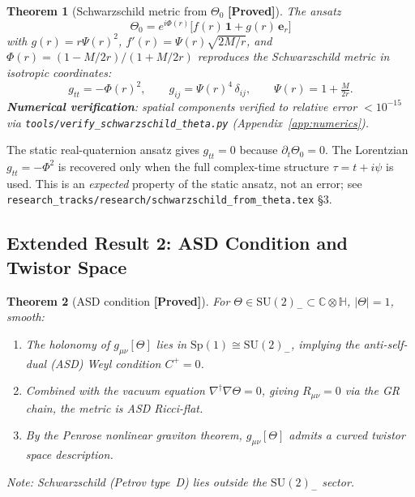 \documentclass[12pt,a4paper]{article}
\newtheorem{theorem}{Theorem}[section]
\theoremstyle{definition}
\theoremstyle{remark}
\newcommand{\PROVED}{\textbf{[Proved]}}
\begin{document}
\begin{theorem}[Schwarzschild metric from $\Theta_0$ \PROVED]
\label{thm:schwarzschild}
The ansatz
\[
  \Theta_0 = e^{i\Phi(r)}\bigl[f(r)\,\mathbf{1} + g(r)\,\boldsymbol{e}_r\bigr]
\]
with $g(r)=r\Psi(r)^2$, $f'(r)=\Psi(r)\sqrt{2M/r}$, and
$\Phi(r)=(1-M/2r)/(1+M/2r)$ reproduces the Schwarzschild metric in
isotropic coordinates:
\[
  g_{tt}=-\Phi(r)^2, \qquad
  g_{ij}=\Psi(r)^4\,\delta_{ij}, \qquad
  \Psi(r) = 1+\tfrac{M}{2r}.
\]
\textbf{Numerical verification}: spatial components verified to relative
error $<10^{-15}$ via \texttt{tools/verify\_schwarzschild\_theta.py}
(Appendix~\ref{app:numerics}).
\end{theorem}

\begin{tcolorbox}[colback=orange!5!white,colframe=orange!50!black,
  title=Limitation — temporal component,arc=3pt]
The static real-quaternion ansatz gives $g_{tt}=0$ because
$\partial_t\Theta_0=0$.  The Lorentzian $g_{tt}=-\Phi^2$ is recovered
only when the full complex-time structure $\tau=t+i\psi$ is used.
This is an \emph{expected} property of the static ansatz, not an error;
see \texttt{research\_tracks/research/schwarzschild\_from\_theta.tex} §3.
\end{tcolorbox}

\subsection{Extended Result 2: ASD Condition and Twistor Space}
\label{sec:asd}

\begin{theorem}[ASD condition \PROVED]
\label{thm:asd}
For $\Theta\in\mathrm{SU}(2)_-\subset\mathbb{C}\otimes\mathbb{H}$,
$|\Theta|=1$, smooth:
\begin{enumerate}
  \item The holonomy of $g_{\mu\nu}[\Theta]$ lies in
        $\mathrm{Sp}(1)\cong\mathrm{SU}(2)_-$, implying the anti-self-dual
        (ASD) Weyl condition $C^+=0$.
  \item Combined with the vacuum equation $\nabla^\dagger\nabla\Theta=0$,
        giving $R_{\mu\nu}=0$ via the GR chain, the metric is ASD Ricci-flat.
  \item By the Penrose nonlinear graviton theorem, $g_{\mu\nu}[\Theta]$
        admits a curved twistor space description.
\end{enumerate}
\emph{Note}: Schwarzschild (Petrov type~D) lies outside the
$\mathrm{SU}(2)_-$ sector.
\end{theorem}
\end{document}
